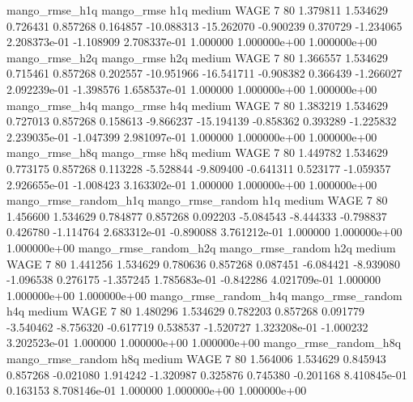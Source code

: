        mango_rmse_h1q        mango_rmse                  h1q     medium     WAGE                 7 80  1.379811       1.534629 0.726431       0.857268    0.164857    -10.088313    -15.262070    -0.900239       0.370729 -1.234065 2.208373e-01    -1.108909   2.708337e-01            1.000000    1.000000e+00        1.000000e+00
       mango_rmse_h2q        mango_rmse                  h2q     medium     WAGE                 7 80  1.366557       1.534629 0.715461       0.857268    0.202557    -10.951966    -16.541711    -0.908382       0.366439 -1.266027 2.092239e-01    -1.398576   1.658537e-01            1.000000    1.000000e+00        1.000000e+00
       mango_rmse_h4q        mango_rmse                  h4q     medium     WAGE                 7 80  1.383219       1.534629 0.727013       0.857268    0.158613     -9.866237    -15.194139    -0.858362       0.393289 -1.225832 2.239035e-01    -1.047399   2.981097e-01            1.000000    1.000000e+00        1.000000e+00
       mango_rmse_h8q        mango_rmse                  h8q     medium     WAGE                 7 80  1.449782       1.534629 0.773175       0.857268    0.113228     -5.528844     -9.809400    -0.641311       0.523177 -1.059357 2.926655e-01    -1.008423   3.163302e-01            1.000000    1.000000e+00        1.000000e+00
mango_rmse_random_h1q mango_rmse_random                  h1q     medium     WAGE                 7 80  1.456600       1.534629 0.784877       0.857268    0.092203     -5.084543     -8.444333    -0.798837       0.426780 -1.114764 2.683312e-01    -0.890088   3.761212e-01            1.000000    1.000000e+00        1.000000e+00
mango_rmse_random_h2q mango_rmse_random                  h2q     medium     WAGE                 7 80  1.441256       1.534629 0.780636       0.857268    0.087451     -6.084421     -8.939080    -1.096538       0.276175 -1.357245 1.785683e-01    -0.842286   4.021709e-01            1.000000    1.000000e+00        1.000000e+00
mango_rmse_random_h4q mango_rmse_random                  h4q     medium     WAGE                 7 80  1.480296       1.534629 0.782203       0.857268    0.091779     -3.540462     -8.756320    -0.617719       0.538537 -1.520727 1.323208e-01    -1.000232   3.202523e-01            1.000000    1.000000e+00        1.000000e+00
mango_rmse_random_h8q mango_rmse_random                  h8q     medium     WAGE                 7 80  1.564006       1.534629 0.845943       0.857268   -0.021080      1.914242     -1.320987     0.325876       0.745380 -0.201168 8.410845e-01     0.163153   8.708146e-01            1.000000    1.000000e+00        1.000000e+00
